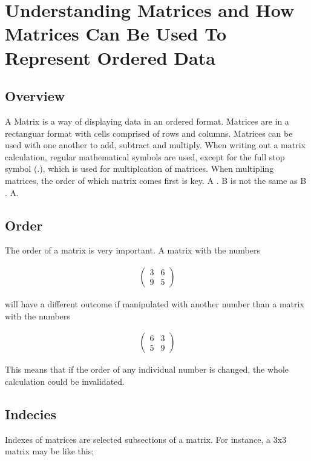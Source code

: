 \documentclass[a4paper,10pt]{article}
\begin{document}
  \newpage

  \section{Understanding Matrices and How Matrices Can Be Used To Represent Ordered Data}
    \subsection{Overview}
      A Matrix is a way of displaying data in an ordered format. Matrices are in a rectanguar format with cells comprised of rows and columns. Matrices can be used with one another to add, subtract and multiply. When writing out a matrix calculation, regular mathematical symbols are used, except for the full stop symbol (.), which is used for multiplcation of matrices. When multipling matrices, the order of which matrix comes first is key. \textsc{A . B} is not the same as \textsc{B . A}.
    \subsection{Order}
      The order of a matrix is very important. A matrix with the numbers

      \begin{align*}
        \begin{pmatrix}
          3 & 6\\
          9 & 5
        \end{pmatrix}
      \end{align*}

      will have a different outcome if manipulated with another number than a matrix with the numbers

      \begin{align*}
        \begin{pmatrix}
          6 & 3\\
          5 & 9
        \end{pmatrix}
      \end{align*}

      This means that if the order of any individual number is changed, the whole calculation could be invalidated.

    \subsection{Indecies}
    Indexes of matrices are selected subsections of a matrix. For instance, a 3x3 matrix may be like this;
\end{document}
